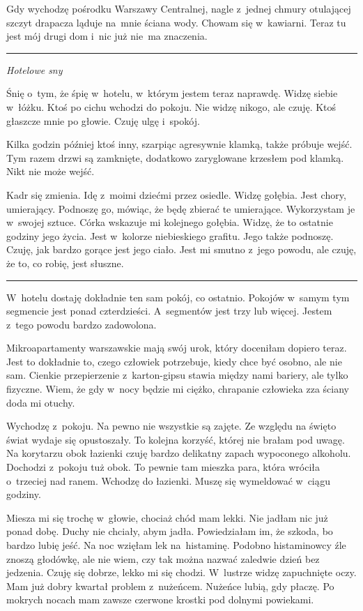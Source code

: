 \documentclass[9pt, a5paper]{memoir}
\begin{document}
Gdy wychodzę pośrodku Warszawy Centralnej, nagle z~jednej chmury otulającej szczyt drapacza ląduje na~mnie ściana wody. Chowam się w~kawiarni. Teraz tu jest mój drugi dom i~nic już nie~ma znaczenia.

\fancybreak{* \quad * \quad *}
\textit{Hotelowe sny}

Śnię o~tym, że śpię w~hotelu, w~którym jestem teraz naprawdę. Widzę siebie w~łóżku. Ktoś po cichu wchodzi do pokoju. Nie widzę nikogo, ale czuję. Ktoś głaszcze mnie po głowie. Czuję ulgę i~spokój.

Kilka godzin później ktoś inny, szarpiąc agresywnie klamką, także próbuje wejść. Tym razem drzwi są zamknięte, dodatkowo zaryglowane krzesłem pod klamką. Nikt nie może wejść.

Kadr się zmienia. Idę z~moimi dziećmi przez osiedle. Widzę gołębia. Jest chory, umierający. Podnoszę go, mówiąc, że będę zbierać te umierające. Wykorzystam je w~swojej sztuce. Córka wskazuje mi kolejnego gołębia. Widzę, że to ostatnie godziny jego życia. Jest w~kolorze niebieskiego grafitu. Jego także podnoszę. Czuję, jak bardzo gorące jest jego ciało. Jest mi smutno z~jego powodu, ale czuję, że to, co robię, jest słuszne.

\fancybreak{* \quad * \quad *}

W~hotelu dostaję dokładnie ten sam pokój, co ostatnio. Pokojów w~samym tym segmencie jest ponad czterdzieści. A~segmentów jest trzy lub więcej. Jestem z~tego powodu bardzo zadowolona.

Mikroapartamenty warszawskie mają swój urok, który doceniłam dopiero teraz. Jest to dokładnie to, czego człowiek potrzebuje, kiedy chce być osobno, ale nie sam. Cienkie przepierzenie z~karton-gipsu stawia między nami bariery, ale tylko fizyczne. Wiem, że gdy w~nocy będzie mi ciężko, chrapanie człowieka zza ściany doda mi otuchy.

Wychodzę z~pokoju. Na pewno nie wszystkie są zajęte. Ze względu na święto świat wydaje się opustoszały. To kolejna korzyść, której nie brałam pod uwagę. Na korytarzu obok łazienki czuję bardzo delikatny zapach wypoconego alkoholu. Dochodzi z~pokoju tuż obok. To pewnie tam mieszka para, która wróciła o~trzeciej nad ranem. Wchodzę do łazienki. Muszę się wymeldować w~ciągu godziny.

Miesza mi się trochę w~głowie, chociaż chód mam lekki. Nie jadłam nic już ponad dobę. Duchy nie chciały, abym jadła. Powiedziałam im, że szkoda, bo bardzo lubię jeść. Na noc wzięłam lek na~histaminę. Podobno histaminowcy źle znoszą głodówkę, ale nie wiem, czy tak można nazwać zaledwie dzień bez jedzenia. Czuję się dobrze, lekko mi się chodzi. W~lustrze widzę zapuchnięte oczy. Mam już dobry kwartał problem z~nużeńcem. Nużeńce lubią, gdy płaczę. Po mokrych nocach mam zawsze czerwone krostki pod dolnymi powiekami.
\end{document}
